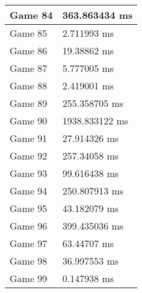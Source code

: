 \begin{tabular}{|l|l|}
	Game 84 & 363.863434 ms \\ \hline
	Game 85 & 2.711993 ms \\ \hline
	Game 86 & 19.38862 ms \\ \hline
	Game 87 & 5.777005 ms \\ \hline
	Game 88 & 2.419001 ms \\ \hline
	Game 89 & 255.358705 ms \\ \hline
	Game 90 & 1938.833122 ms \\ \hline
	Game 91 & 27.914326 ms \\ \hline
	Game 92 & 257.34058 ms \\ \hline
	Game 93 & 99.616438 ms \\ \hline
	Game 94 & 250.807913 ms \\ \hline
	Game 95 & 43.182079 ms \\ \hline
	Game 96 & 399.435036 ms \\ \hline
	Game 97 & 63.44707 ms \\ \hline
	Game 98 & 36.997553 ms \\ \hline
	Game 99 & 0.147938 ms \\ \hline
\end{tabular}
